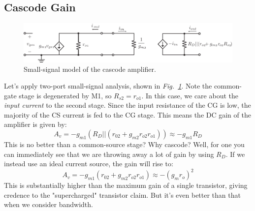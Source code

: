 \subsection{Cascode Gain}
\begin{figure}[tb]
\centering
\includegraphics[scale=0.95]{11cascode_ss}
\caption{Small-signal model of the cascode amplifier.}
\label{fig:11cascode_ss}
\end{figure}
Let's apply two-port small-signal analysis, shown in \emph{Fig.~\ref{fig:11cascode_ss}}.  Note the common-gate stage is degenerated by M1, so $R_{s2} = r_{o1}$. In this case, we care about the \textit{input current }to the second stage. Since the input resistance of the CG is low, the majority of the CS current is fed to the CG stage.  This means the DC gain of the amplifier is given by:
    \begin{equation}
        A_v = -g_{m1} \left(R_D || (r_{02} + g_{m2}r_{o2} r_{o1}) \right) \approx -g_{m1} R_D
    \end{equation}
This is no better than a common-source stage?  Why cascode?  Well, for one you can immediately see that we are throwing away a lot of gain by using $R_D$.  If we instead use an ideal current source, the gain will rise to:
    \begin{equation}
        A_v = -g_{m1}  (r_{02} + g_{m2}r_{o2} r_{o1}) \approx - (g_m r_o)^2 
    \end{equation}
This is substantially higher than the maximum gain of a single transistor, giving credence to the "supercharged" transistor claim.  But it's even better than that when we consider bandwidth. 
